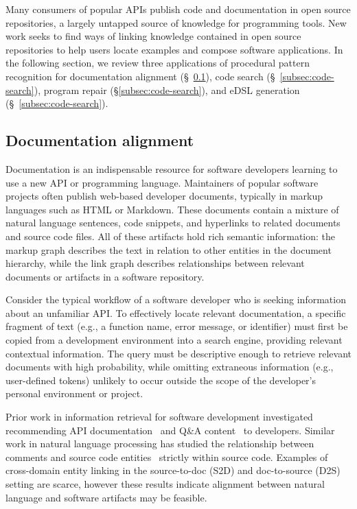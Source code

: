 \documentclass[10pt]{article}
\begin{document}
Many consumers of popular APIs publish code and documentation in open source repositories, a largely untapped source of knowledge for programming tools. New work seeks to find ways of linking knowledge contained in open source repositories to help users locate examples and compose software applications. In the following section, we review three applications of procedural pattern recognition for documentation alignment (\S~\ref{subsec:tracelink}), code search (\S~\ref{subsec:code-search}), program repair (\S\ref{subsec:code-search}), and eDSL generation (\S~\ref{subsec:code-search}).

\pagebreak\subsection{Documentation alignment}\label{subsec:tracelink}

Documentation is an indispensable resource for software developers learning to use a new API or programming language. Maintainers of popular software projects often publish web-based developer documents, typically in markup languages such as HTML or Markdown. These documents contain a mixture of natural language sentences, code snippets, and hyperlinks to related documents and source code files. All of these artifacts hold rich semantic information: the markup graph describes the text in relation to other entities in the document hierarchy, while the link graph describes relationships between relevant documents or artifacts in a software repository.

Consider the typical workflow of a software developer who is seeking information about an unfamiliar API. To effectively locate relevant documentation, a specific fragment of text (e.g., a function name, error message, or identifier) must first be copied from a development environment into a search engine, providing relevant contextual information. The query must be descriptive enough to retrieve relevant documents with high probability, while omitting extraneous information (e.g., user-defined tokens) unlikely to occur outside the scope of the developer's personal environment or project.

Prior work in information retrieval for software development investigated recommending API documentation~\cite{robillard2015recommending} and Q\&A content~\cite{treude2016augmenting} to developers. Similar work in natural language processing has studied the relationship between comments and source code entities~\cite{iyer2018mapping, panthaplackel2020associating} strictly within source code. Examples of cross-domain entity linking in the source-to-doc (S2D) and doc-to-source (D2S) setting are scarce, however these results indicate alignment between natural language and software artifacts may be feasible.
\end{document}
